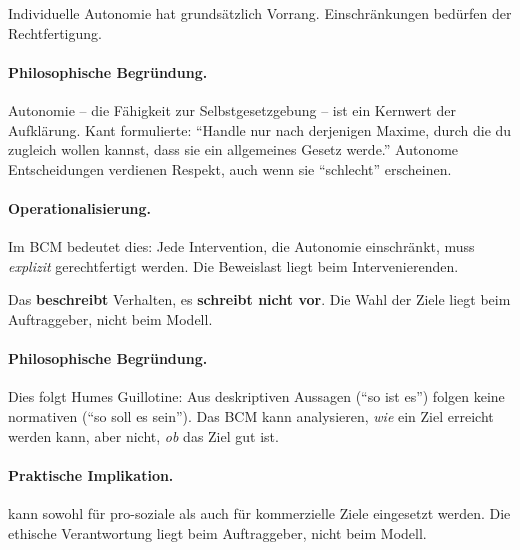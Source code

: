 \begin{axiom}
Individuelle Autonomie hat grundsätzlich Vorrang. Einschränkungen bedürfen der Rechtfertigung.

\paragraph{Philosophische Begründung.}
Autonomie -- die Fähigkeit zur Selbstgesetzgebung -- ist ein Kernwert der Aufklärung. Kant formulierte: ``Handle nur nach derjenigen Maxime, durch die du zugleich wollen kannst, dass sie ein allgemeines Gesetz werde.'' Autonome Entscheidungen verdienen Respekt, auch wenn sie ``schlecht'' erscheinen.

\paragraph{Operationalisierung.}
Im BCM bedeutet dies: Jede Intervention, die Autonomie einschränkt, muss \textit{explizit} gerechtfertigt werden. Die Beweislast liegt beim Intervenierenden.
\end{axiom}

\begin{axiom}
Das \BCM{} \textbf{beschreibt} Verhalten, es \textbf{schreibt nicht vor}. Die Wahl der Ziele liegt beim Auftraggeber, nicht beim Modell.

\paragraph{Philosophische Begründung.}
Dies folgt Humes Guillotine: Aus deskriptiven Aussagen (``so ist es'') folgen keine normativen (``so soll es sein''). Das BCM kann analysieren, \textit{wie} ein Ziel erreicht werden kann, aber nicht, \textit{ob} das Ziel gut ist.

\paragraph{Praktische Implikation.}
\BEATRIX{} kann sowohl für pro-soziale als auch für kommerzielle Ziele eingesetzt werden. Die ethische Verantwortung liegt beim Auftraggeber, nicht beim Modell.
\end{axiom}


